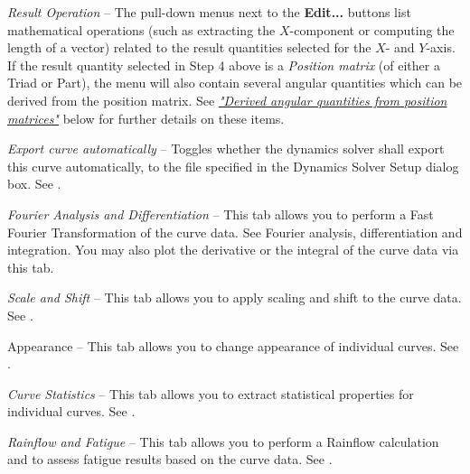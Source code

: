 \begin{bulletlist}

\item{\sl Result Operation} --
  The pull-down menus next to the \textbf{Edit...} buttons list mathematical
  operations (such as extracting the $X$-component or computing the length of a
  vector) related to the result quantities selected for the $X$- and $Y$-axis.
  If the result quantity selected in Step 4 above is a {\sl Position matrix}
  (of either a Triad or Part), the menu will also contain several angular
  quantities which can be derived from the position matrix. See
  \protect\hyperlink{derived-angular-quantities-from-position-matrices}
                    {\sl"Derived angular quantities from position matrices"}
  below for further details on these items.


\item{\sl Export curve automatically} --
  Toggles whether the dynamics solver shall export this curve automatically,
  to the file specified in the Dynamics Solver Setup dialog box.
  See .

\item{\sl Fourier Analysis and Differentiation} -- This tab
  allows you to perform a Fast Fourier Transformation of the curve data. See
             {Fourier analysis, differentiation and integration}. You may
  also plot the derivative or the integral of the curve data via this tab.

\clearpage
\item{\sl Scale and Shift} --
  This tab allows you to apply scaling and shift to the curve data.
  See .

\item{Appearance} --
  This tab allows you to change appearance of individual curves.
  See .

\item{\sl Curve Statistics} --
  This tab allows you to extract statistical properties for individual curves.
  See .

\item{\sl Rainflow and Fatigue} --
  This tab allows you to perform a Rainflow calculation and to assess fatigue
  results based on the curve data. See
  .
\end{bulletlist}

